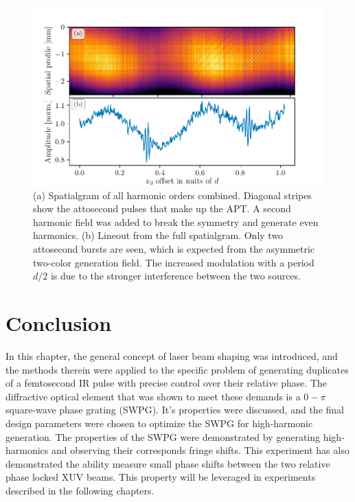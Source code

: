 \begin{figure}
	\centering
	\includegraphics[width=1.0\textwidth]{figures/Two_source/full_spatialgram_w2w.pdf}
	\caption{(a) Spatialgram of all harmonic orders combined. Diagonal stripes show the attosecond pulses that make up the APT. A second harmonic field was added to break the symmetry and generate even harmonics. (b) Lineout from the full spatialgram.  Only two attosecond bursts are seen, which is expected from the asymmetric two-color generation field.  The increased modulation with a period $d/2$ is due to the stronger interference between the two sources.}
	\label{fig:full_spatialgram_w2w}
\end{figure}

\section{Conclusion}
In this chapter, the general concept of laser beam shaping was introduced, and the methods therein were applied to the specific problem of generating duplicates of a femtosecond IR pulse with precise control over their relative phase. The diffractive optical element that was shown to meet these demands is a $0-\pi$ square-wave phase grating (SWPG).  It's properties were discussed, and the final design parameters were chosen to optimize the SWPG for high-harmonic generation.  The properties of the SWPG were demonstrated by  generating high-harmonics and observing their corresponds fringe shifts.  This experiment has also demonstrated the ability measure small phase shifts between the two relative phase locked XUV beams.  This property will be leveraged in experiments described in the following chapters.
